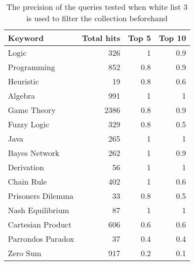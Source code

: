 \begin{table}[h!]
\centering
\begin{tabular} {|| p{15em} | r | r | r ||} 
 \hline
 Keyword & Total hits & Top 5 & Top 10 \\ [0.5ex] 
 \hline

Logic & 326 & 1 & 0.9 \\
Programming & 852 & 0.8 & 0.9 \\
Heuristic & 19 & 0.8 & 0.6 \\
Algebra & 991 & 1 & 1 \\
Game Theory & 2386 & 0.8 & 0.9 \\
\hline
Fuzzy Logic & 329 & 0.8 & 0.5 \\
Java & 265 & 1 & 1 \\
Bayes Network & 262 & 1 & 0.9 \\
Derivation & 56 & 1 & 1 \\
\hline
Chain Rule & 402 & 1 & 0.6 \\
Prisoners Dilemma & 33 & 0.8 & 0.5 \\
Nash Equilibrium & 87 & 1 & 1 \\
Cartesian Product & 606 & 0.6 & 0.6 \\
Parrondos Paradox & 37 & 0.4 & 0.4 \\
Zero Sum & 917 & 0.2 & 0.1 \\

 \hline
\end{tabular}
\caption{The precision of the queries tested when white list 3 is used to filter the collection beforehand}
\label{table:p_test_list3}
\end{table}

